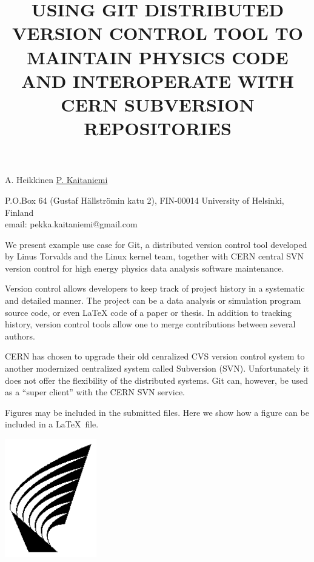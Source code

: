 \documentclass[12pt]{article}
\begin{document}
\title{USING GIT DISTRIBUTED VERSION CONTROL TOOL TO MAINTAIN PHYSICS
  CODE AND INTEROPERATE WITH CERN SUBVERSION REPOSITORIES}

A. Heikkinen \underline{P. Kaitaniemi}

P.O.Box 64 (Gustaf H\"allstr\"omin katu 2), FIN-00014 University of Helsinki, Finland\\
email: pekka.kaitaniemi@gmail.com

\vspace{\baselineskip}


We present example use case for Git, a distributed version control
tool developed by Linus Torvalds and the Linux kernel team, together
with CERN central SVN version control for high energy physics data
analysis software maintenance.

Version control allows developers to keep track of project history in
a systematic and detailed manner. The project can be a data analysis
or simulation program source code, or even LaTeX code of a paper or
thesis. In addition to tracking history, version control tools allow
one to merge contributions between several authors.

CERN has chosen to upgrade their old cenralized CVS version control
system to another modernized centralized system called Subversion
(SVN). Unfortunately it does not offer the flexibility of the
distributed systems. Git can, however, be used as a ``super client''
with the CERN SVN service.


\begin{minipage}{9cm}
Figures may be included in the submitted files. Here we show how a
figure can be included in a \LaTeX\ file.
\end{minipage}
\hfill
\begin{minipage}{5cm}
\includegraphics[width=4cm]{logo.eps}
\end{minipage}
\end{document}
